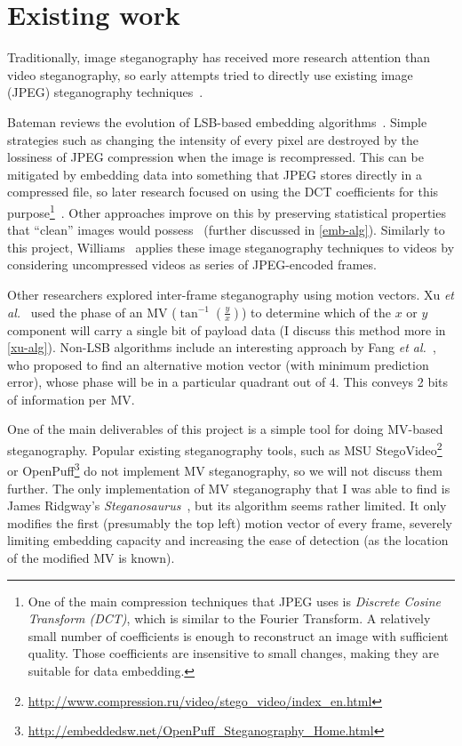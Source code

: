 \documentclass[12pt,british,twoside,notitlepage,usenames,dvipsnames,hypens,final]{report}
\numberwithin{equation}{section}
\numberwithin{figure}{section}
\begin{document}
\section{Existing work}

Traditionally, image steganography has received more research attention than video steganography, so early attempts tried to directly use existing image (JPEG) steganography techniques~\cite{bateman, jpegdctcoding}.

Bateman reviews the evolution of LSB-based embedding algorithms~\cite{bateman}. Simple strategies such as changing the intensity of every pixel are destroyed by the lossiness of JPEG compression when the image is recompressed. This can be mitigated by embedding data into something that JPEG stores directly in a compressed file, so later research focused on using the DCT coefficients for this purpose\footnote{
One of the main compression techniques that JPEG uses is \emph{Discrete Cosine Transform (DCT)}, which is similar to the Fourier Transform. A relatively small number of coefficients is enough to reconstruct an image with sufficient quality. Those coefficients are insensitive to small changes, making they are suitable for data embedding.}~\cite{jpegdctcoding}. Other approaches improve on this by preserving statistical properties that ``clean'' images would possess~\cite{bateman, f5} (further discussed in \ref{emb-alg}). Similarly to this project, Williams~\cite{scott-fs} applies these image steganography techniques to videos by considering uncompressed videos as series of JPEG-encoded frames.

Other researchers explored inter-frame steganography using motion vectors. Xu \emph{et al.}~\cite{xu2006steganography} used the phase of an MV ($\tan^{-1}(\frac{y}{x})$) to determine which of the $x$ or $y$ component will carry a single bit of payload data (I discuss this method more in \ref{xu-alg}). Non-LSB algorithms include an interesting approach by Fang \emph{et al.}~\cite{fang2006data}, who proposed to find an alternative motion vector (with minimum prediction error), whose phase will be in a particular quadrant out of 4. This conveys 2 bits of information per MV.

One of the main deliverables of this project is a simple tool for doing MV-based steganography. Popular existing steganography tools, such as MSU StegoVideo\footnote{\url{http://www.compression.ru/video/stego_video/index_en.html}} or OpenPuff\footnote{\url{http://embeddedsw.net/OpenPuff_Steganography_Home.html}} do not implement MV steganography, so we will not discuss them further. The only implementation of MV steganography that I was able to find is James Ridgway's \emph{Steganosaurus}~\cite{steganosaurus}, but its algorithm seems rather limited. It only modifies the first (presumably the top left) motion vector of every frame, severely limiting embedding capacity and increasing the ease of detection (as the location of the modified MV is known).
\end{document}
